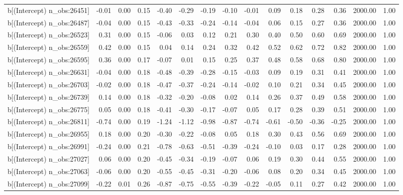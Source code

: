 \begin{table}[ht]
\begin{tabular}{rrrrrrrrrrrrrrr}
  b[(Intercept) n\_obs:26451] & -0.01 & 0.00 & 0.15 & -0.40 & -0.29 & -0.19 & -0.10 & -0.01 & 0.09 & 0.18 & 0.28 & 0.36 & 2000.00 & 1.00 \\ 
  b[(Intercept) n\_obs:26487] & -0.04 & 0.00 & 0.15 & -0.43 & -0.33 & -0.24 & -0.14 & -0.04 & 0.06 & 0.15 & 0.27 & 0.36 & 2000.00 & 1.00 \\ 
  b[(Intercept) n\_obs:26523] & 0.31 & 0.00 & 0.15 & -0.06 & 0.03 & 0.12 & 0.21 & 0.30 & 0.40 & 0.50 & 0.60 & 0.69 & 2000.00 & 1.00 \\ 
  b[(Intercept) n\_obs:26559] & 0.42 & 0.00 & 0.15 & 0.04 & 0.14 & 0.24 & 0.32 & 0.42 & 0.52 & 0.62 & 0.72 & 0.82 & 2000.00 & 1.00 \\ 
  b[(Intercept) n\_obs:26595] & 0.36 & 0.00 & 0.17 & -0.07 & 0.01 & 0.15 & 0.25 & 0.37 & 0.48 & 0.58 & 0.68 & 0.80 & 2000.00 & 1.00 \\ 
  b[(Intercept) n\_obs:26631] & -0.04 & 0.00 & 0.18 & -0.48 & -0.39 & -0.28 & -0.15 & -0.03 & 0.09 & 0.19 & 0.31 & 0.41 & 2000.00 & 1.00 \\ 
  b[(Intercept) n\_obs:26703] & -0.02 & 0.00 & 0.18 & -0.47 & -0.37 & -0.24 & -0.14 & -0.02 & 0.10 & 0.21 & 0.34 & 0.45 & 2000.00 & 1.00 \\ 
  b[(Intercept) n\_obs:26739] & 0.14 & 0.00 & 0.18 & -0.32 & -0.20 & -0.08 & 0.02 & 0.14 & 0.26 & 0.37 & 0.49 & 0.58 & 2000.00 & 1.00 \\ 
  b[(Intercept) n\_obs:26775] & 0.05 & 0.00 & 0.18 & -0.41 & -0.30 & -0.17 & -0.07 & 0.05 & 0.17 & 0.28 & 0.39 & 0.51 & 2000.00 & 1.00 \\ 
  b[(Intercept) n\_obs:26811] & -0.74 & 0.00 & 0.19 & -1.24 & -1.12 & -0.98 & -0.87 & -0.74 & -0.61 & -0.50 & -0.36 & -0.25 & 2000.00 & 1.00 \\ 
  b[(Intercept) n\_obs:26955] & 0.18 & 0.00 & 0.20 & -0.30 & -0.22 & -0.08 & 0.05 & 0.18 & 0.30 & 0.43 & 0.56 & 0.69 & 2000.00 & 1.00 \\ 
  b[(Intercept) n\_obs:26991] & -0.24 & 0.00 & 0.21 & -0.78 & -0.63 & -0.51 & -0.39 & -0.24 & -0.10 & 0.03 & 0.17 & 0.28 & 2000.00 & 1.00 \\ 
  b[(Intercept) n\_obs:27027] & 0.06 & 0.00 & 0.20 & -0.45 & -0.34 & -0.19 & -0.07 & 0.06 & 0.19 & 0.30 & 0.44 & 0.55 & 2000.00 & 1.00 \\ 
  b[(Intercept) n\_obs:27063] & -0.06 & 0.00 & 0.20 & -0.55 & -0.45 & -0.31 & -0.20 & -0.06 & 0.08 & 0.20 & 0.34 & 0.45 & 2000.00 & 1.00 \\ 
  b[(Intercept) n\_obs:27099] & -0.22 & 0.01 & 0.26 & -0.87 & -0.75 & -0.55 & -0.39 & -0.22 & -0.05 & 0.11 & 0.27 & 0.42 & 2000.00 & 1.00 \\ 

\end{tabular}
\end{table}
